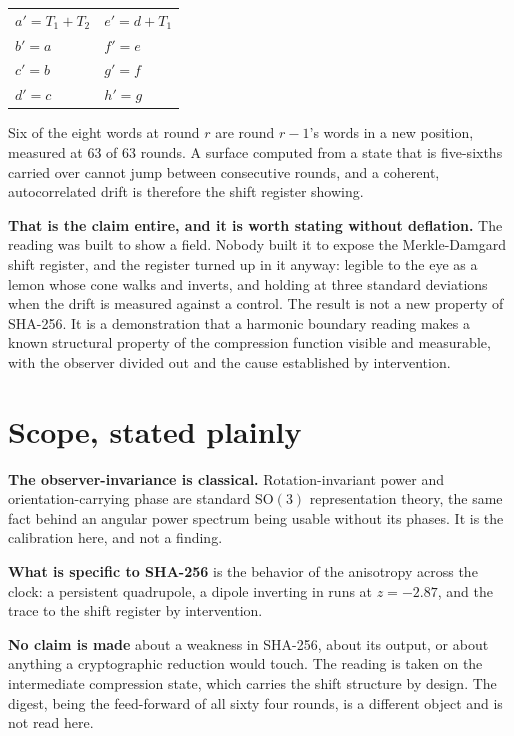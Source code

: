 \begin{center}
\begin{tabular}{@{}ll@{}}
\toprule
\(a' = T_1 + T_2\) & \(e' = d + T_1\) \\
\(b' = a\) & \(f' = e\) \\
\(c' = b\) & \(g' = f\) \\
\(d' = c\) & \(h' = g\) \\
\bottomrule
\end{tabular}
\end{center}

Six of the eight words at round \(r\) are round \(r-1\)'s words in a new position, measured at \(63\) of \(63\) rounds. A surface computed from a state that is five-sixths carried over cannot jump between consecutive rounds, and a coherent, autocorrelated drift is therefore the shift register showing.

\textbf{That is the claim entire, and it is worth stating without deflation.} The reading was built to show a field. Nobody built it to expose the Merkle-Damgard shift register, and the register turned up in it anyway: legible to the eye as a lemon whose cone walks and inverts, and holding at three standard deviations when the drift is measured against a control. The result is not a new property of SHA-256. It is a demonstration that a harmonic boundary reading makes a known structural property of the compression function visible and measurable, with the observer divided out and the cause established by intervention.

\section{Scope, stated plainly}

\textbf{The observer-invariance is classical.} Rotation-invariant power and orientation-carrying phase are standard \(\mathrm{SO}(3)\) representation theory, the same fact behind an angular power spectrum being usable without its phases. It is the calibration here, and not a finding.

\textbf{What is specific to SHA-256} is the behavior of the anisotropy across the clock: a persistent quadrupole, a dipole inverting in runs at \(z = -2.87\), and the trace to the shift register by intervention.

\textbf{No claim is made} about a weakness in SHA-256, about its output, or about anything a cryptographic reduction would touch. The reading is taken on the intermediate compression state, which carries the shift structure by design. The digest, being the feed-forward of all sixty four rounds, is a different object and is not read here.

